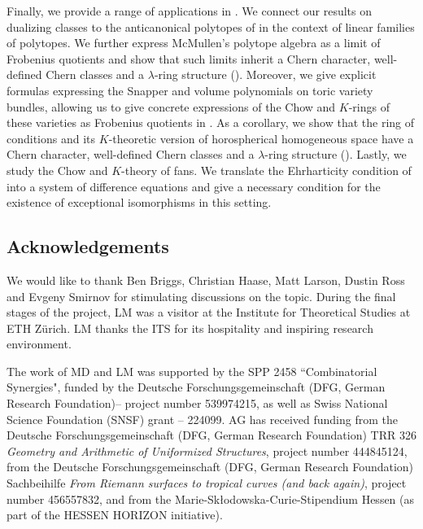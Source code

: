 \documentclass[oneside]{amsart}
\theoremstyle{plain}
\theoremstyle{definition}
\begin{document}
Finally, we provide a range of applications in . We connect our results on dualizing classes to the anticanonical polytopes of \cite{kavvil} in the context of linear families of polytopes. We further express McMullen's polytope algebra as a limit of Frobenius quotients and show that such limits inherit a Chern character, well-defined Chern classes and a $\lambda$-ring structure (). Moreover, we give explicit formulas expressing the Snapper and volume polynomials on toric variety bundles, allowing us to give concrete expressions of the Chow and $K$-rings of these varieties as Frobenius quotients in . As a corollary, we show that the ring of conditions and its $K$-theoretic version of horospherical homogeneous space have a Chern character, well-defined Chern classes and a $\lambda$-ring structure (). Lastly, we study the Chow and $K$-theory of fans. We translate the Ehrharticity condition of \cite{EhrhartFans} into a system of difference equations and give a necessary condition for the existence of exceptional isomorphisms in this setting.

\subsection*{Acknowledgements}
We would like to thank Ben Briggs, Christian Haase, Matt Larson, Dustin Ross and Evgeny Smirnov for stimulating discussions on the topic. During the final stages of the project, LM was a visitor at the Institute for Theoretical Studies at ETH Z\"urich. LM thanks the ITS for its  hospitality and inspiring research environment.

The work of MD and LM was supported by the SPP 2458 ``Combinatorial Synergies", funded by the Deutsche Forschungsgemeinschaft (DFG, German Research Foundation)-- project number 539974215, as well as Swiss National Science Foundation (SNSF) grant -- %
224099. AG has received funding from the Deutsche Forschungsgemeinschaft (DFG, German Research Foundation) TRR 326 \emph{Geometry and Arithmetic of Uniformized Structures}, project number 444845124, from the Deutsche Forschungsgemeinschaft (DFG, German Research Foundation) Sachbeihilfe \emph{From Riemann surfaces to tropical curves (and back again)}, project number 456557832, and from the Marie-Sk\l{}odowska-Curie-Stipendium Hessen (as part of the HESSEN HORIZON initiative).
\end{document}

